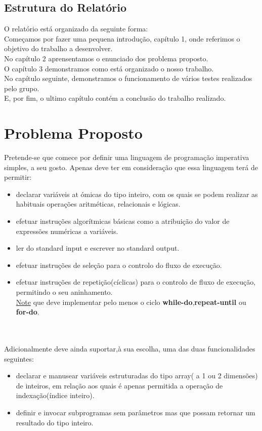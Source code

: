 \documentclass[11pt,a4paper]{report}%
\begin{document}
\newpage


\section*{Estrutura do Relatório}
O relatório está organizado da seguinte forma:\\
Começamos por fazer uma pequena introdução, capítulo 1, onde referimos o objetivo do trabalho a desenvolver. \\
No capítulo 2 aprensentamos o enunciado dos problema proposto.\\
O capítulo 3 demonstramos como está organizado o nosso trabalho.\\
No capítulo seguinte, demonstramos o funcionamento de vários testes realizados pelo grupo.\\
E, por fim, o ultimo capítulo contém a conclusão do trabalho realizado.

\newpage



\chapter{Problema Proposto}

Pretende-se que comece por definir uma linguagem de programação imperativa simples, a seu gosto.
Apenas deve ter em consideração que essa linguagem terá de permitir:
\begin{itemize}
	\item declarar variáveis at ómicas do tipo inteiro, com os quais se podem realizar as habituais operações aritméticas, relacionais e lógicas.
	\item efetuar instruções algorítmicas básicas como a atribuição do valor de expressões numéricas a variáveis.
	\item ler do standard input e escrever no standard output.
    \item efetuar instruções de seleção para o controlo do fluxo de execução.
    \item efetuar instruções de repetição(cíclicas) para o controlo de fluxo de execução, permitindo o seu aninhamento.\\
    \underline{Note} que deve implementar pelo menos o ciclo \textbf{while-do},\textbf{repeat-until} ou \textbf{for-do}.
\end{itemize}
\\ \\
Adicionalmente deve ainda suportar,à sua escolha, uma das duas funcionalidades seguintes:
\begin{itemize}
    \item declarar e manusear variáveis estruturadas do tipo array( a 1 ou 2 dimensões) de inteiros, em relação aos quais é apenas permitida a operação de indexação(índice inteiro).
    \item definir e invocar subprogramas sem parâmetros mas que possam retornar um resultado do tipo inteiro.
\end{itemize}
\end{document}
